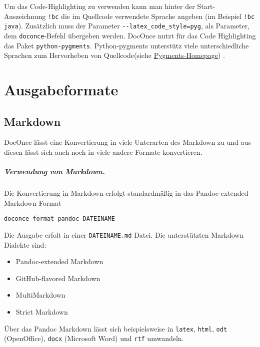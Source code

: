 \documentclass[%
oneside,                 %
final,                   %
chapterprefix=true,      %
open=right,              %
10pt]{book}
\begin{document}
Um das Code-Highlighting zu verwenden kann man hinter der Start-Auszeichnung \Verb?!bc? die im Quellcode verwendete Sprache angeben (im Beispiel \Verb?!bc java?). Zusätzlich muss der Parameter \Verb!--latex_code_style=pyg!, als Parameter, dem \texttt{doconce}-Befehl übergeben werden. DocOnce nutzt für das Code Highlighting das Paket \texttt{python-pygments}. Python-pygments unterstütz viele unterschiedliche Sprachen zum Hervorheben von Quellcode(siehe \href{{http://pygments.org/docs/cmdline/#getting-lexer-names}}{Pygments-Homepage}) .
\chapter{Ausgabeformate}

\section{Markdown}
DocOnce lässt eine Konvertierung in viele Unterarten des Markdown zu und aus diesen lässt sich auch noch in viele andere Formate konvertieren.
\paragraph{ Verwendung von Markdown.}
Die Konvertierung in Markdown erfolgt standardmäßig in das Pandoc-extended Markdown Format
\begin{verbatim}
doconce format pandoc DATEINAME
\end{verbatim}
Die Ausgabe erfolt in einer \texttt{DATEINAME.md} Datei. Die unterstützten Markdown Dialekte sind:
\begin{itemize}
\item Pandoc-extended Markdown

\item GitHub-flavored Markdown

\item MultiMarkdown

\item Strict Markdown
\end{itemize}

\noindent
Über das Pandoc Markdown lässt sich beispielsweise in \texttt{latex}, \texttt{html}, \texttt{odt} (OpenOffice), \texttt{docx} (Microsoft Word) und \texttt{rtf} umwandeln.
\end{document}
